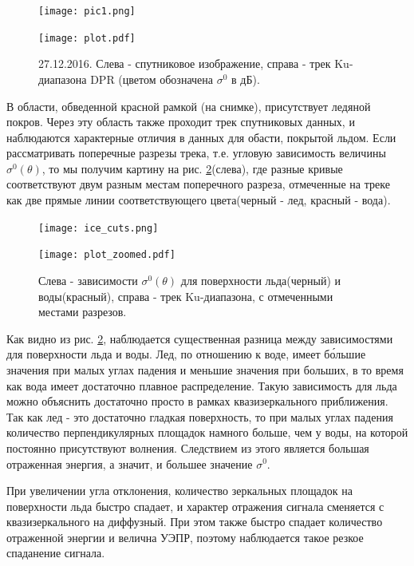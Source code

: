 \begin{figure}[h!]
  \centering
  \begin{minipage}{.49\linewidth}
    \texttt{[image: pic1.png]}
  \end{minipage}
  \begin{minipage}{.49\linewidth}
    \texttt{[image: plot.pdf]}
  \end{minipage}
  \caption{27.12.2016. Слева - спутниковое изображение, справа - трек Ku-диапазона DPR (цветом обозначена $\sigma^0$ в дБ).}
  \label{fig:3}
\end{figure}

В области, обведенной красной рамкой (на снимке), присутствует ледяной покров. Через эту область также проходит трек
спутниковых данных, и наблюдаются характерные отличия в данных для обасти, покрытой льдом. Если рассматривать поперечные
разрезы трека, т.е. угловую зависимость величины $\sigma^0(\theta)$, то мы получим картину на рис. \ref{fig:4}(слева), где
разные кривые соответствуют двум разным местам поперечного разреза, отмеченные на треке как две прямые линии
соответствующего цвета(черный - лед, красный - вода).

\begin{figure}[h!]
  \centering
  \begin{minipage}{.49\linewidth}
    \texttt{[image: ice\_cuts.png]}
  \end{minipage}
  \begin{minipage}{.49\linewidth}
    \texttt{[image: plot\_zoomed.pdf]}
  \end{minipage}
  \caption{Слева - зависимости $\sigma^0(\theta)$ для поверхности льда(черный) и воды(красный), справа - трек Ku-диапазона, с отмеченными местами разрезов. }
  \label{fig:4}
\end{figure}

Как видно из рис. \ref{fig:4}, наблюдается существенная разница между зависимостями для поверхности льда и воды. Лед, по
отношению к воде, имеет б\'{о}льшие значения при малых углах падения и меньшие значения при больших, в то время как вода
имеет достаточно плавное распределение. Такую зависимость для льда можно объяснить достаточно просто в рамках
квазизеркального приближения. Так как лед - это достаточно гладкая поверхность, то при малых углах падения количество
перпендикулярных площадок намного больше, чем у воды, на которой постоянно присутствуют волнения. Следствием из этого
является большая отраженная энергия, а значит, и большее значение $\sigma^0$. 

При увеличении угла отклонения, количество зеркальных площадок на поверхности льда быстро спадает, и характер отражения сигнала
сменяется с квазизеркального на диффузный. При этом также быстро спадает количество отраженной энергии и велична УЭПР,
поэтому наблюдается такое резкое спаданение сигнала.

